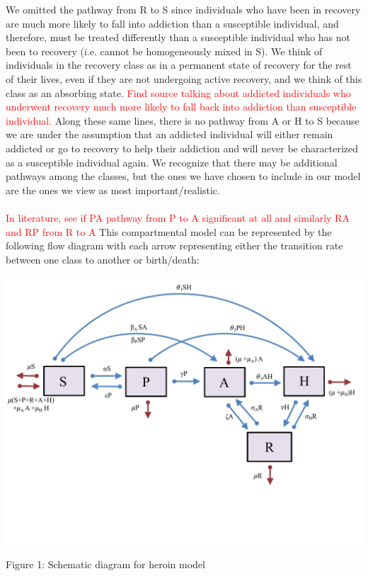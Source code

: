 \documentclass[12pt]{article}
\begin{document}
We omitted the pathway from R to S since individuals who have been in recovery are much more likely to fall into addiction than a susceptible individual, and therefore, must be treated differently than a susceptible individual who has not been to recovery (i.e. cannot be homogeneously mixed in S). We think of individuals in the recovery class as in a permanent state of recovery for the rest of their lives, even if they are not undergoing active recovery, and we think of this class as an absorbing state. \textcolor{red}{Find source talking about addicted individuals who underwent recovery much more likely to fall back into addiction than susceptible individual.} Along these same lines, there is no pathway from A or H to S because we are under the assumption that an addicted individual will either remain addicted or go to recovery to help their addiction and will never be characterized as a susceptible individual again. We recognize that there may be additional pathways among the classes, but the ones we have chosen to include in our model are the ones we view as most important/realistic. \\ \\
\textcolor{red}{In literature, see if PA pathway from P to A significant at all and similarly RA and RP from R to A} 
This compartmental model can be represented by the following flow diagram with each arrow representing either the transition rate between one class to another or birth/death: 

\includegraphics[scale=0.6]{heroin_schematic.pdf}
\vspace{-0.8cm}
\begin{center}
Figure 1: Schematic diagram for heroin model
\end{center}
\end{document}
